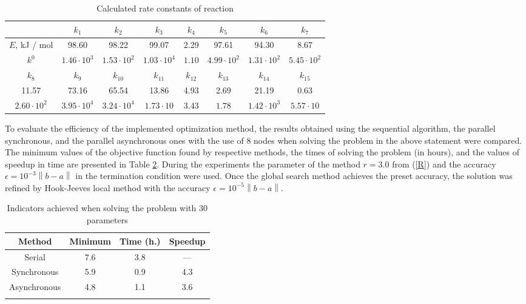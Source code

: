 \documentclass{svproc}
\begin{document}
\begin{table}
\label{table_res1}
\caption{Calculated rate constants of reaction}
\begin{center}
\begin{tabular}{cccccccc}
\hline
 & $k_1$ & $k_2$ & $k_3$ & $k_4$ & $k_5$ & $k_6$ & $k_7$\\
\hline\rule{0pt}{12pt}
$E$, kJ / mol & 98.60 & 98.22 & 99.07 & 2.29 & 97.61 & 94.30 & 8.67\\
$k^0$ & $1.46\cdot10^3$ & $1.53\cdot10^2$ & $1.03\cdot10^4$ & $1.10$ & $4.99\cdot10^2$  & $1.31\cdot10^2$ & $5.45\cdot10^2$\\
\hline
$k_8$ & $k_9$ & $k_{10}$ & $k_{11}$ & $k_{12}$ & $k_{13}$ & $k_{14}$ & $k_{15}$ \\
\hline\rule{0pt}{12pt}
11.57 & 73.16 & 65.54 & 13.86 & 4.93 & 2.69 & 21.19 & 0.63\\
$2.60\cdot10^2$ & $3.95\cdot10^4$ & $3.24\cdot10^4$ & $1.73\cdot10$ & $3.43$ & $1.78$ & $1.42\cdot10^3$ & $5.57\cdot10$\\[2pt]
\hline
\end{tabular}\end{center}\end{table}

To evaluate the efficiency of the implemented optimization method, the results obtained using the sequential algorithm, the parallel synchronous, and the parallel asynchronous ones with the use of 8 nodes when solving the problem in the above statement were compared.  
The minimum values of the objective function found by respective methods, the times of solving the problem (in hours), and the values of speedup in time are presented in Table \ref{table_30D}. 
During the experiments the parameter of the method $r=3.0$ from (\ref{R}) and the accuracy  $\epsilon = 10^{-3}\left\|b-a\right\|$ in the termination condition were used. Once the global search method achieves the preset accuracy, the solution was refined by Hook-Jeeves local method \cite{HookJeeves} with the accuracy $\epsilon = 10^{-5}\left\|b-a\right\|$.

\begin{table}
\caption{Indicators achieved when solving the problem with 30 parameters}
\label{table_30D}
\begin{center}
\begin{tabular}{cccc}
\hline\noalign{\smallskip}
 Method      & Minimum  & Time (h.) & Speedup \\
\hline\noalign{\smallskip}
Serial       & 7.6   &    3.8     &  ---        \\
Synchronous  & 5.9   &   0.9     &   4.3       \\
Asynchronous & 4.8   &   1.1     &   3.6       \\
\noalign{\smallskip}\hline
\end{tabular}\end{center}\end{table}
\end{document}
